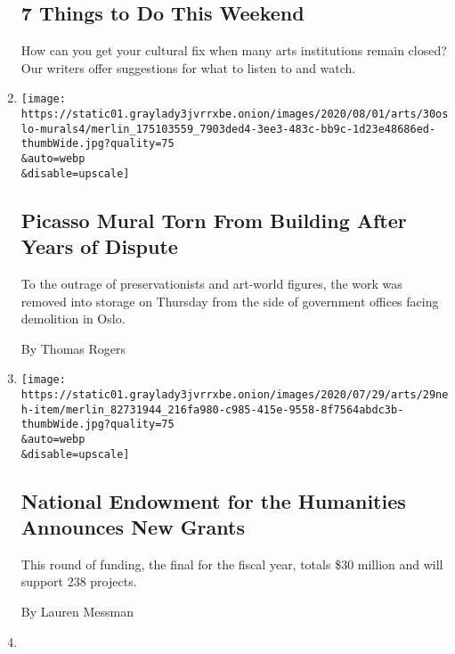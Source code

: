 \begin{enumerate}
{  \subsection{7 Things to Do This
  Weekend}\label{7-things-to-do-this-weekend}}

  How can you get your cultural fix when many arts institutions remain
  closed? Our writers offer suggestions for what to listen to and watch.
\item
  \href{/2020/07/30/arts/design/picasso-fishermen-mural-norway.html}{}

  \texttt{[image: https://static01.graylady3jvrrxbe.onion/images/2020/08/01/arts/30oslo-murals4/merlin\_175103559\_7903ded4-3ee3-483c-bb9c-1d23e48686ed-thumbWide.jpg?quality=75\\\&auto=webp\\\&disable=upscale]}

  \hypertarget{picasso-mural-torn-from-building-after-years-of-dispute}{%
  \subsection{Picasso Mural Torn From Building After Years of
  Dispute}\label{picasso-mural-torn-from-building-after-years-of-dispute}}

  To the outrage of preservationists and art-world figures, the work was
  removed into storage on Thursday from the side of government offices
  facing demolition in Oslo.

  By Thomas Rogers
\item
  \href{/2020/07/29/arts/national-endowment-for-the-humanities-grants.html}{}

  \texttt{[image: https://static01.graylady3jvrrxbe.onion/images/2020/07/29/arts/29neh-item/merlin\_82731944\_216fa980-c985-415e-9558-8f7564abdc3b-thumbWide.jpg?quality=75\\\&auto=webp\\\&disable=upscale]}

  \hypertarget{national-endowment-for-the-humanities-announces-new-grants}{%
  \subsection{National Endowment for the Humanities Announces New
  Grants}\label{national-endowment-for-the-humanities-announces-new-grants}}

  This round of funding, the final for the fiscal year, totals \$30
  million and will support 238 projects.

  By Lauren Messman
\item
  \href{/2020/07/28/arts/design/sothebys-banksy-rembrandt.html}{}


\end{enumerate}
